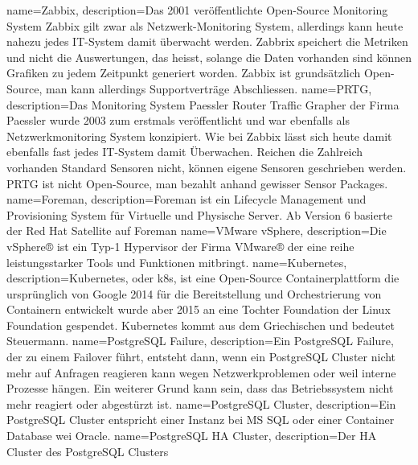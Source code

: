 {
        name=Zabbix,
        description={Das 2001 veröffentlichte Open-Source Monitoring System Zabbix gilt zwar als Netzwerk-Monitoring System, allerdings kann heute nahezu jedes IT-System damit überwacht werden.
        Zabbrix speichert die Metriken und nicht die Auswertungen, das heisst, solange die Daten vorhanden sind können Grafiken zu jedem Zeitpunkt generiert worden.
        Zabbix ist grundsätzlich Open-Source, man kann allerdings Supportverträge Abschliessen.}
}
{
        name=PRTG,
        description={Das Monitoring System Paessler Router Traffic Grapher der Firma Paessler wurde 2003 zum erstmals veröffentlicht und war ebenfalls als Netzwerkmonitoring System konzipiert.
        Wie bei Zabbix lässt sich heute damit ebenfalls fast jedes IT-System damit Überwachen.
        Reichen die Zahlreich vorhanden Standard Sensoren nicht, können eigene Sensoren geschrieben werden.
        PRTG ist nicht Open-Source, man bezahlt anhand gewisser Sensor Packages.}
}
{
        name=Foreman,
        description={Foreman ist ein Lifecycle Management und Provisioning System für Virtuelle und Physische Server.
        Ab Version 6 basierte der Red Hat Satellite auf Foreman}
}
{
        name=VMware vSphere,
        description={Die vSphere® ist ein Typ-1 Hypervisor der Firma VMware® der eine reihe leistungsstarker Tools und Funktionen mitbringt.}
}
{
        name=Kubernetes,
        description={Kubernetes, oder k8s, ist eine Open-Source Containerplattform die ursprünglich von Google 2014 für die Bereitstellung und Orchestrierung von Containern entwickelt wurde aber 2015 an eine Tochter Foundation der Linux Foundation gespendet.
        Kubernetes kommt aus dem Griechischen und bedeutet Steuermann.}
}
{
        name=PostgreSQL Failure,
        description={Ein PostgreSQL Failure, der zu einem Failover führt, entsteht dann, wenn ein \Gls{PostgreSQL Cluster} nicht mehr auf Anfragen reagieren kann wegen Netzwerkproblemen oder weil interne Prozesse hängen.
        Ein weiterer Grund kann sein, dass das Betriebssystem nicht mehr reagiert oder abgestürzt ist.}
}
{
        name=PostgreSQL Cluster,
        description={Ein PostgreSQL Cluster entspricht einer Instanz bei MS SQL oder einer Container Database wei Oracle.}
}
{
        name=PostgreSQL HA Cluster,
        description={Der HA Cluster des \Gls{PostgreSQL Cluster}s}
}
